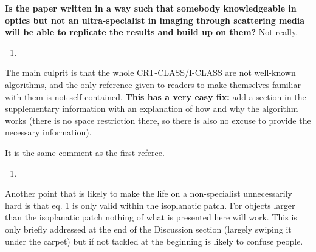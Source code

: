 \documentclass[12pt]{article}
\newenvironment{solved_reviewercomment}
    {\begin{tcolorbox}[width=\linewidth,colback=gray!5,colframe=solved_commentcolor!50,title=Reviewer Comment,left=5pt,right=5pt]}
    {\end{tcolorbox}}
\newenvironment{ourresponse}
    {\begin{tcolorbox}[width=\linewidth,breakable,enhanced,colback=gray!5,colframe=responsecolor!50,title=Response,left=5pt,right=5pt]}
    {\end{tcolorbox}}
\begin{document}
\textbf{Is the paper written in a way such that somebody knowledgeable in optics but not an ultra-specialist in imaging through scattering media will be able to replicate the results and build up on them?} Not really. 

\begin{enumerate}[label=\arabic*.]
\item \leavevmode
\end{enumerate}
\vspace{-1em}
\begin{solved_reviewercomment}
    The main culprit is that the whole CRT-CLASS/I-CLASS are not well-known algorithms, and the only reference given to readers to make themselves familiar with them is not self-contained. \textbf{This has a very easy fix:} add a section in the supplementary information with an explanation of how and why the algorithm works (there is no space restriction there, so there is also no excuse to provide the necessary information).
\end{solved_reviewercomment}
\begin{ourresponse}
    It is the same comment as the first referee.
\end{ourresponse}

\begin{enumerate}[label=\arabic*., resume]
\item \leavevmode
\end{enumerate}
\vspace{-1em}
\begin{solved_reviewercomment}
    Another point that is likely to make the life on a non-specialist unnecessarily hard is that eq. 1 is only valid within the isoplanatic patch. For objects larger than the isoplanatic patch nothing of what is presented here will work. This is only briefly addressed at the end of the Discussion section (largely swiping it under the carpet) but if not tackled at the beginning is likely to confuse people.
    
\end{solved_reviewercomment}
\end{document}
